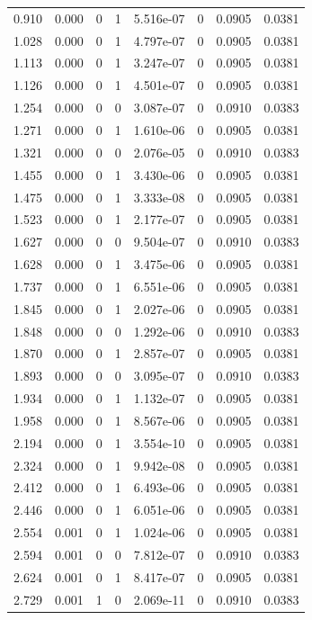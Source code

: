 \documentclass[preview]{standalone}
\begin{document}
{{\begin{tabular}{L{1.2cm}C{1.2cm} C{0.3cm}C{0.5cm} C{1.4cm}C{1.4cm} C{1.4cm}C{1.4cm}}
  0.910  &  0.000  & 0     &  1 &  5.516e-07  & 0  & 0.0905 &  0.0381   \\ 
  1.028  &  0.000  & 0     &  1 &  4.797e-07  & 0  & 0.0905 &  0.0381   \\ 
  1.113  &  0.000  & 0     &  1 &  3.247e-07  & 0  & 0.0905 &  0.0381   \\ 
  1.126  &  0.000  & 0     &  1 &  4.501e-07  & 0  & 0.0905 &  0.0381   \\ 
  1.254  &  0.000  & 0     &  0 &  3.087e-07  & 0  & 0.0910 &  0.0383   \\ 
  1.271  &  0.000  & 0     &  1 &  1.610e-06  & 0  & 0.0905 &  0.0381   \\ 
  1.321  &  0.000  & 0     &  0 &  2.076e-05  & 0  & 0.0910 &  0.0383   \\ 
  1.455  &  0.000  & 0     &  1 &  3.430e-06  & 0  & 0.0905 &  0.0381   \\ 
  1.475  &  0.000  & 0     &  1 &  3.333e-08  & 0  & 0.0905 &  0.0381   \\ 
  1.523  &  0.000  & 0     &  1 &  2.177e-07  & 0  & 0.0905 &  0.0381   \\ 
  1.627  &  0.000  & 0     &  0 &  9.504e-07  & 0  & 0.0910 &  0.0383   \\ 
  1.628  &  0.000  & 0     &  1 &  3.475e-06  & 0  & 0.0905 &  0.0381   \\ 
  1.737  &  0.000  & 0     &  1 &  6.551e-06  & 0  & 0.0905 &  0.0381   \\ 
  1.845  &  0.000  & 0     &  1 &  2.027e-06  & 0  & 0.0905 &  0.0381   \\ 
  1.848  &  0.000  & 0     &  0 &  1.292e-06  & 0  & 0.0910 &  0.0383   \\ 
  1.870  &  0.000  & 0     &  1 &  2.857e-07  & 0  & 0.0905 &  0.0381   \\ 
  1.893  &  0.000  & 0     &  0 &  3.095e-07  & 0  & 0.0910 &  0.0383   \\ 
  1.934  &  0.000  & 0     &  1 &  1.132e-07  & 0  & 0.0905 &  0.0381   \\ 
  1.958  &  0.000  & 0     &  1 &  8.567e-06  & 0  & 0.0905 &  0.0381   \\ 
  2.194  &  0.000  & 0     &  1 &  3.554e-10  & 0  & 0.0905 &  0.0381   \\ 
  2.324  &  0.000  & 0     &  1 &  9.942e-08  & 0  & 0.0905 &  0.0381   \\ 
  2.412  &  0.000  & 0     &  1 &  6.493e-06  & 0  & 0.0905 &  0.0381   \\ 
  2.446  &  0.000  & 0     &  1 &  6.051e-06  & 0  & 0.0905 &  0.0381   \\ 
  2.554  &  0.001  & 0     &  1 &  1.024e-06  & 0  & 0.0905 &  0.0381   \\ 
  2.594  &  0.001  & 0     &  0 &  7.812e-07  & 0  & 0.0910 &  0.0383   \\ 
  2.624  &  0.001  & 0     &  1 &  8.417e-07  & 0  & 0.0905 &  0.0381   \\ 
  2.729  &  0.001  & 1     &  0 &  2.069e-11  & 0  & 0.0910 &  0.0383   \\ 
\hline 
\end{tabular} 

}}
\end{document}
